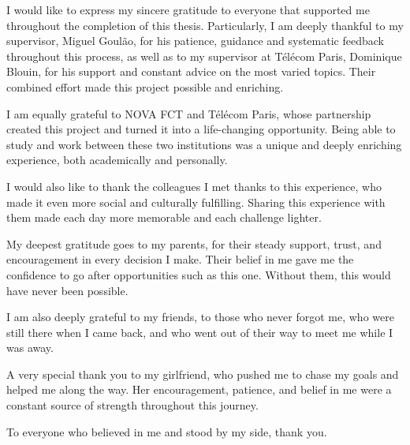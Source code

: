 
%

\begin{ntacknowledgements}
	
I would like to express my sincere gratitude to everyone that supported me throughout the completion of this thesis. Particularly, I am deeply thankful to my supervisor, Miguel Goulão, for his patience, guidance and systematic feedback throughout this process, as well as to my supervisor at Télécom Paris, Dominique Blouin, for his support and constant advice on the most varied topics. Their combined effort made this project possible and enriching.

I am equally grateful to NOVA FCT and Télécom Paris, whose partnership created this project and turned it into a life-changing opportunity. Being able to study and work between these two institutions was a unique and deeply enriching experience, both academically and personally.

I would also like to thank the colleagues I met thanks to this experience, who made it even more social and culturally fulfilling. Sharing this experience with them made each day more memorable and each challenge lighter.

My deepest gratitude goes to my parents, for their steady support, trust, and encouragement in every decision I make. Their belief in me gave me the confidence to go after opportunities such as this one. Without them, this would have never been possible.

I am also deeply grateful to my friends, to those who never forgot me, who were still there when I came back, and who went out of their way to meet me while I was away.

A very special thank you to my girlfriend, who pushed me to chase my goals and helped me along the way. Her encouragement, patience, and belief in me were a constant source of strength throughout this journey.

To everyone who believed in me and stood by my side, thank you.


\end{ntacknowledgements}